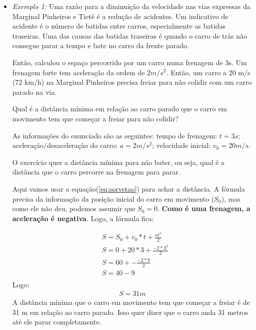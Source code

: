 \documentclass[12pt]{extarticle}
\newcommand{\<}{\langle}
\renewcommand{\>}{\rangle}
\theoremstyle{definition}
\begin{document}
        \begin{itemize}
            \item \textit{Exemplo 1:} Uma razão para a diminuição da velocidade nas vias expressas da Marginal Pinheiros e Tietê é a redução de acidentes. Um indicativo de acidente é o número de batidas entre carros, especialmente as batidas traseiras. Uma das causas das batidas traseiras é quando o carro de trás não consegue parar a tempo e bate no carro da frente parado. 
            
            Então, calculou o espaço percorrido por um carro numa frenagem de 3s. Um frenagem forte tem aceleração da ordem de $2 m/s^2$. Então, um carro a 20 m/s (72 km/h) na Marginal Pinheiros precisa freiar para não colidir com um carro parado na via. 
            
            Qual é a distância mínima em relação ao carro parado que o carro em movimento tem que começar a freiar para não colidir?
            
            As informações do enunciado são as seguintes: tempo de frenagem: $t=3s$; aceleração/desaceleração do carro: $a = 2m/s^2$; velocidade inicial: $v_0 = 20m/s$. 
            
            O exercício quer a distância mínima para não bater, ou seja, qual é a distância que o carro percorre na frenagem para parar.
            
            Aqui vamos usar a equação(\ref{eq:sorvetao}) para achar a distância. A fórmula precisa da informação da posição inicial do carro em movimento ($S_0$), mas como ele não deu, podemos assumir que $S_0=0$. \textbf{Como é uma frenagem, a aceleração é negativa}. Logo, a fórmula fica:
            
            \begin{align*}
                &S = S_0 + v_0*t + \frac{at^2}{2} \\
                & S = 0 + 20*3 + \frac{-2*3^2}{2}\\
                & S = 60 + -\frac{-2*9}{2} \\
                & S = 40 - 9\\
            \end{align*}
            Logo:
            \begin{align}
                \boxed{S = 31 m}
            \end{align}
            A distância mínima que o carro em movimento tem que começar a freiar é de 31 m em relação ao carro parado. Isso quer dizer que o carro anda 31 metros até ele parar completamente.
            

\end{itemize}
\end{document}
